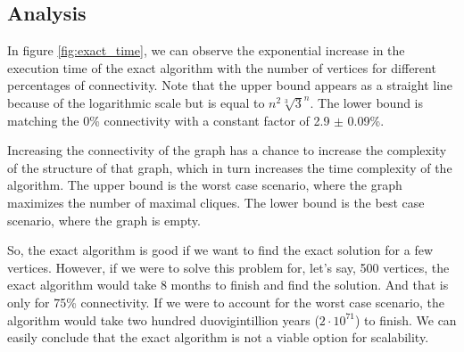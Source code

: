\subsection{Analysis}

In figure \ref{fig:exact_time}, we can observe the exponential increase in the
execution time of the exact algorithm with the number of vertices for different
percentages of connectivity. Note that the upper bound appears as a straight
line because of the logarithmic scale but is equal to $n^2\sqrt[3]{3}^n$. The
lower bound is matching the 0\% connectivity with a constant factor of
2.9 $\pm$ 0.09\%. \bigskip

Increasing the connectivity of the graph has a chance to increase the complexity
of the structure of that graph, which in turn increases the time complexity of the
algorithm. The upper bound is the worst case scenario, where the graph maximizes
the number of maximal cliques. The lower bound is the best case scenario, where
the graph is empty. \bigskip

So, the exact algorithm is good if we want to find the exact solution for a few 
vertices. However, if we were to solve this problem for, let's say, 500 vertices,
the exact algorithm would take 8 months to finish and find the solution. And that is
only for 75\% connectivity. If we were to account for the worst case scenario,
the algorithm would take two hundred duovigintillion years ($2\cdot10^{71}$) 
to finish. We can easily conclude that the exact algorithm is not a viable option
for scalability.